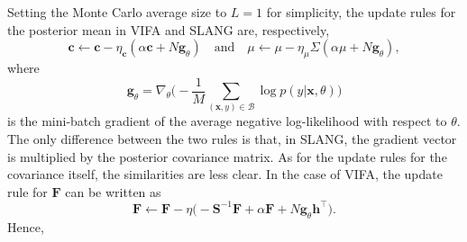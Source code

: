 \documentclass[msc,deptreport.inf]{infthesis} %
\newcommand{\matr}[1]{\mathbf{#1}}
\begin{document}
Setting the Monte Carlo average size to $L=1$ for simplicity, the update rules for the posterior mean in VIFA and SLANG are, respectively,
 \begin{equation}
 	\matr{c} \leftarrow \matr{c} - \eta_\matr{c} (\alpha \matr{c} + N \matr{g}_\theta) \quad \text{and} \quad 
 	\mu \leftarrow \mu - \eta_\mu \Sigma (\alpha \mu + N \matr{g}_\theta),
\end{equation}
where
\begin{equation}
	\matr{g}_\theta = \nabla_\theta \Big(-\frac{1}{M} \sum_{(\matr{x}, y) \in \mathcal{B}} \log p(y | \matr{x}, \theta)\Big)
\end{equation}
is the mini-batch gradient of the average negative log-likelihood with respect to $\theta$. The only difference between the two rules is that, in SLANG, the gradient vector is multiplied by the posterior covariance matrix. As for the update rules for the covariance itself, the similarities are less clear. In the case of VIFA, the update rule for $\matr{F}$ can be written as
\begin{equation}
	\matr{F} \leftarrow \matr{F} - \eta \big(-\matr{S}^{-1} \matr{F} + \alpha \matr{F} + N \matr{g}_\theta \matr{h}^\intercal \big).
\end{equation}
Hence,
\end{document}
